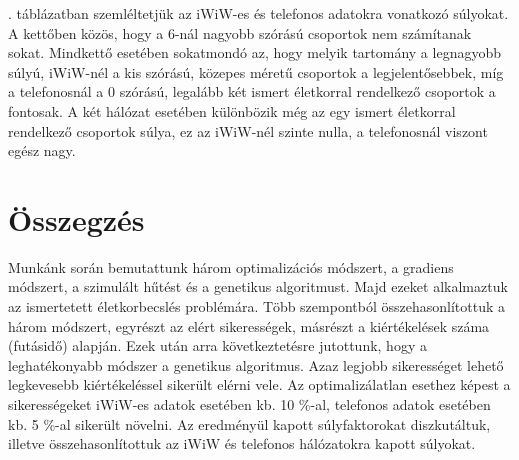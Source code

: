 \documentclass[12pt]{article}
\begin{document}
. táblázatban szemléltetjük az iWiW-es és telefonos adatokra vonatkozó súlyokat. A kettőben közös, hogy a 6-nál nagyobb szórású csoportok nem számítanak sokat. Mindkettő esetében sokatmondó az, hogy melyik tartomány a legnagyobb súlyú, iWiW-nél a kis szórású, közepes méretű csoportok a legjelentősebbek, míg a telefonosnál a 0 szórású, legalább két ismert életkorral rendelkező csoportok a fontosak. %
A két hálózat esetében különbözik még az egy ismert életkorral rendelkező csoportok súlya, ez az iWiW-nél szinte nulla, a telefonosnál viszont egész nagy.

\section{Összegzés}
Munkánk során bemutattunk három optimalizációs módszert, a gradiens módszert, a szimulált hűtést és a genetikus algoritmust. Majd ezeket alkalmaztuk az ismertetett életkorbecslés problémára. Több szempontból összehasonlítottuk a három módszert, egyrészt az elért sikerességek, másrészt a kiértékelések száma (futásidő) alapján. Ezek után arra következtetésre jutottunk, hogy a leghatékonyabb módszer a genetikus algoritmus. Azaz legjobb sikerességet lehető legkevesebb kiértékeléssel sikerült elérni vele.
Az optimalizálatlan esethez képest a sikerességeket iWiW-es adatok esetében kb. 10 \%-al, telefonos adatok esetében kb. 5 \%-al sikerült növelni.
Az eredményül kapott súlyfaktorokat diszkutáltuk, illetve összehasonlítottuk az iWiW és telefonos hálózatokra kapott súlyokat.


\end{document}
